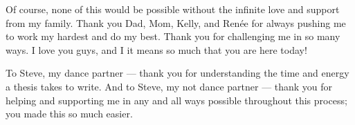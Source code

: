 \begin{preamble}
\begin{acknowledgments}
Of course, none of this would be possible without the infinite love and support 
from my family.  Thank you Dad, Mom, Kelly, and Ren\'{e}e for always pushing me 
to work my hardest and do my best.  Thank you for challenging me in so many 
ways.  I love you guys, and I it means so much that you are here today!

To Steve, my dance partner --- thank you for understanding the time and energy 
a thesis takes to write.  And to Steve, my not dance partner --- thank you for 
helping and supporting me in any and all ways possible throughout this process; 
you made this so much easier.
\end{acknowledgments}

\iffinal{}{\newpage}


\tableofcontents

\iffinal{}{\newpage}


\listoftables

\iffinal{}{\newpage}


\listoffigures

\iffinal{}{\newpage}


\begin{abstract}


\end{abstract}
\end{preamble}

